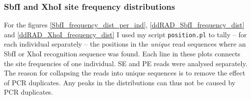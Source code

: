 \documentclass[a4paper,12pt,times,authoryear,twoside,print,index]{Classes/PhDThesisPSnPDF}\usepackage[]{graphicx}\usepackage[]{color}
\begin{document}
\subsubsection{SbfI and XhoI site frequency distributions}\label{site_frequency_distributions}

For the figures \ref{SbfI_frequency_dist_per_ind}, \ref{ddRAD_SbfI_frequency_dist} and \ref{ddRAD_XhoI_frequency_dist} I used my script \texttt{position.pl} to tally -- for each individual separately -- the positions in the \emph{unique} read sequences where an SbfI or XhoI recognition sequence was found. Each line in these plots connects the site frequencies of one individual. SE and PE reads were analysed separately. The reason for collapsing the reads into unique sequences is to remove the effect of PCR duplicates. Any peaks in the distributions can thus not be caused by PCR duplicates.
\end{document}
